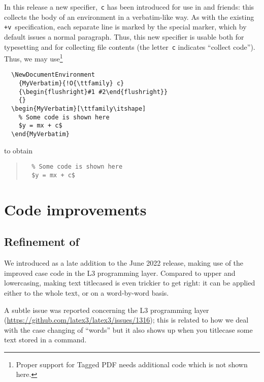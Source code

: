 \documentclass{ltnews}
\begin{document}
In this release a new specifier,~\texttt{c} has been introduced for
use in  and friends: this collects the body
of an environment in a verbatim-like way.  As with the existing
\texttt{+v}~specification, each separate line is marked by the special
 marker, which
by default
issues a normal
paragraph. Thus, this new specifier is usable both for typesetting and
for collecting file contents (the letter~\texttt{c} indicates
\enquote{collect code}).  Thus, we may use\footnote{Proper support 
for Tagged PDF needs additional code which is not shown here.}
\begin{verbatim}
  \NewDocumentEnvironment
    {MyVerbatim}{!O{\ttfamily} c}
    {\begin{flushright}#1 #2\end{flushright}}
    {}
  \begin{MyVerbatim}[\ttfamily\itshape]
    % Some code is shown here
    $y = mx + c$
  \end{MyVerbatim}
\end{verbatim}
to obtain
\begin{quote}
\makeatletter
\def\@verbatim{%
  \trivlist
  \raggedleft
  \let \do \@makeother
  \dospecials
  \obeylines
  \normalfont \ttfamily \itshape
  \@noligs
}
\begin{verbatim}
  % Some code is shown here
  $y = mx + c$
\end{verbatim}
\end{quote}



\section{Code improvements}

\subsection{Refinement of }

We introduced  as a late addition to the June 2022
release, making use of the improved case code in the L3 programming
layer. Compared to upper and lowercasing, making text titlecased is even
trickier to get right: it can be applied either to the whole text, or
on a word-by-word basis.

A subtle issue was reported concerning the L3 programming layer
(\url{https://github.com/latex3/latex3/issues/1316}); this
is related to how we deal with the case changing of \enquote{words}
but it also shows up when you titlecase some text stored in a command.
\end{document}
